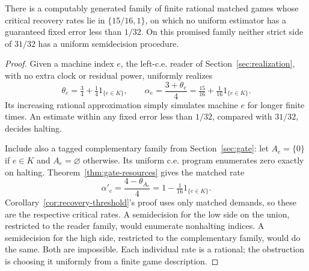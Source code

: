 \begin{proposition}\label{prop:recovery-undecidable}
There is a computably generated family of finite rational matched games whose critical recovery rates lie in $\{15/16,1\}$, on which no uniform estimator has a guaranteed fixed error less than $1/32$. On this promised family neither strict side of $31/32$ has a uniform semidecision procedure.
\end{proposition}
\begin{proof}
Given a machine index $e$, the left-c.e. reader of Section~\ref{sec:realization}, with no extra clock or residual power, uniformly realizes
\[
 \theta_e=\tfrac34+\tfrac14 1_{\{e\in K\}},\qquad
 \alpha_e=\frac{3+\theta_e}{4}
          =\tfrac{15}{16}+\tfrac1{16}1_{\{e\in K\}}.
\]
Its increasing rational approximation simply simulates machine $e$ for longer finite times. An estimate within any fixed error less than $1/32$, compared with $31/32$, decides halting.

Include also a tagged complementary family from Section~\ref{sec:gate}: let $A_e=\{0\}$ if $e\in K$ and $A_e=\varnothing$ otherwise. Its uniform c.e. program enumerates zero exactly on halting. Theorem~\ref{thm:gate-resources} gives the matched rate
\[
 \alpha'_e=\frac{4-\theta_{A_e}}4
           =1-\tfrac1{16}1_{\{e\in K\}}.
\]
Corollary~\ref{cor:recovery-threshold}'s proof uses only matched demands, so these are the respective critical rates. A semidecision for the low side on the union, restricted to the reader family, would enumerate nonhalting indices. A semidecision for the high side, restricted to the complementary family, would do the same. Both are impossible. Each individual rate is a rational; the obstruction is choosing it uniformly from a finite game description.
\end{proof}

